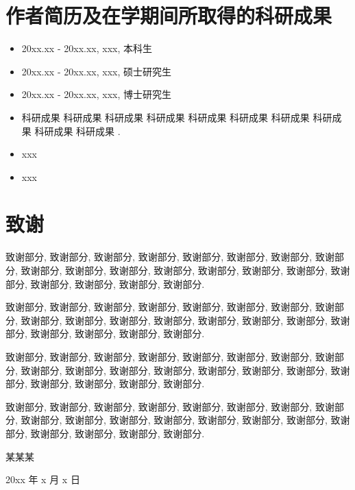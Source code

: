 \documentclass[openany]{MathematicalModelCaseStudyReport}  %
\let\cleardoublepage\clearpage
\numberwithin{algorithm}{chapter}
\begin{document}
\clearpage{\pagestyle{empty}\cleardoublepage}
\chapter*{作者简历及在学期间所取得的科研成果}

\begin{itemize}
  \item 20xx.xx - 20xx.xx, xxx, 本科生
  \item 20xx.xx - 20xx.xx, xxx, 硕士研究生
  \item 20xx.xx - 20xx.xx, xxx, 博士研究生
\end{itemize}

\bigskip\bigskip
{}
\begin{itemize}
  \item[{[1]}]
    科研成果 科研成果 科研成果 科研成果 科研成果
    科研成果 科研成果 科研成果 科研成果 科研成果 .

  \item[{[2]}] xxx
  \item[{[3]}] xxx
\end{itemize}



\clearpage{\pagestyle{empty}\cleardoublepage}
\chapter*{致谢}

致谢部分, 致谢部分, 致谢部分, 致谢部分, 致谢部分,
致谢部分, 致谢部分, 致谢部分, 致谢部分, 致谢部分,
致谢部分, 致谢部分, 致谢部分, 致谢部分, 致谢部分,
致谢部分, 致谢部分, 致谢部分, 致谢部分, 致谢部分.

致谢部分, 致谢部分, 致谢部分, 致谢部分, 致谢部分,
致谢部分, 致谢部分, 致谢部分, 致谢部分, 致谢部分,
致谢部分, 致谢部分, 致谢部分, 致谢部分, 致谢部分,
致谢部分, 致谢部分, 致谢部分, 致谢部分, 致谢部分.

致谢部分, 致谢部分, 致谢部分, 致谢部分, 致谢部分,
致谢部分, 致谢部分, 致谢部分, 致谢部分, 致谢部分,
致谢部分, 致谢部分, 致谢部分, 致谢部分, 致谢部分,
致谢部分, 致谢部分, 致谢部分, 致谢部分, 致谢部分.

致谢部分, 致谢部分, 致谢部分, 致谢部分, 致谢部分,
致谢部分, 致谢部分, 致谢部分, 致谢部分, 致谢部分,
致谢部分, 致谢部分, 致谢部分, 致谢部分, 致谢部分,
致谢部分, 致谢部分, 致谢部分, 致谢部分, 致谢部分.

\bigskip\bigskip
\mbox{}\hfill 某某某\qquad\mbox{} \par
\mbox{}\hfill 20xx 年 x 月 x 日
\end{document}
